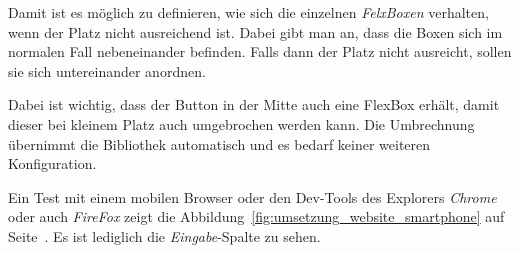 Damit ist es möglich zu definieren, wie sich die einzelnen \textit{FelxBoxen} verhalten, wenn der Platz nicht
ausreichend ist. Dabei gibt man an, dass die Boxen sich im normalen Fall nebeneinander befinden. Falls dann der Platz
nicht ausreicht, sollen sie sich untereinander anordnen.

Dabei ist wichtig, dass der Button in der Mitte auch eine FlexBox erhält, damit dieser bei kleinem Platz auch
umgebrochen werden kann. Die Umbrechnung übernimmt die Bibliothek automatisch und es bedarf keiner weiteren
Konfiguration.

Ein Test mit einem mobilen Browser oder den Dev-Tools des Explorers \textit{Chrome} oder auch \textit{FireFox} zeigt die
Abbildung~\ref{fig:umsetzung_website_smartphone} auf Seite~\pageref{fig:umsetzung_website_smartphone}. Es ist lediglich
die \textit{Eingabe}-Spalte zu sehen.

